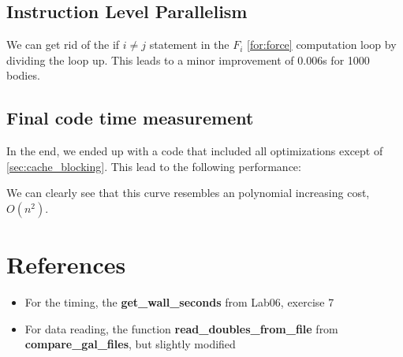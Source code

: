 \documentclass[a4paper]{scrartcl}
\begin{document}
        \subsection{Instruction Level Parallelism}
            We can get rid of the if $i \neq j$  statement in the $F_i$ \ref{for:force}
            computation loop by dividing the loop up. This leads to a minor
            improvement of 0.006s for 1000 bodies.
        
        \subsection{Final code time measurement}
            In the end, we ended up with a code that included all optimizations
            except of \ref{sec:cache_blocking}. This lead to the following
            performance:


            We can clearly see that this curve resembles an polynomial
            increasing cost, $O(n^2)$.
        


\section{References}
    \begin{itemize}
        \item For the timing, the \textbf{get\_wall\_seconds} from Lab06, exercise 7
        \item For data reading, the function \textbf{read\_doubles\_from\_file} from \textbf{compare\_gal\_files}, but slightly modified
    \end{itemize}
\end{document}
